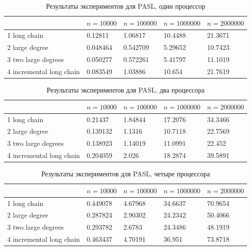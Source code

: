 \documentclass[specification,annotation,times]{itmo-student-thesis}
\begin{document}
\begin{table}[!ht]
\centering
\begin{tabular}{|l|l|l|l|l|}\hline
 & $n=10000$ & $n=100000$ & $n=1000000$ & $n=2000000$ \\\hline
1 long chain & 0.12811 & 1.06817 & 10.4488 & 21.3671 \\\hline
2 large degree & 0.048464 & 0.542709 & 5.29652 & 10.7423 \\\hline
3 two large degrees & 0.050277 & 0.572261 & 5.41797 & 11.1019 \\\hline
4 incremental long chain & 0.083549 & 1.03886 & 10.654 & 21.7619 \\\hline
\end{tabular}
\caption{Результаты экспериментов для PASL, один процессор}\label{tbl:results-pasl-1}
\end{table}

\begin{table}[!ht]
\centering
\begin{tabular}{|l|l|l|l|l|}\hline
 & $n=10000$ & $n=100000$ & $n=1000000$ & $n=2000000$ \\\hline
1 long chain & 0.21437 & 1.84844 & 17.2076 & 34.3466 \\\hline
2 large degree & 0.139132 & 1.1316 & 10.7118 & 22.7569 \\\hline
3 two large degrees & 0.138923 & 1.14019 & 11.0991 & 22.452 \\\hline
4 incremental long chain & 0.204059 & 2.026 & 18.2874 & 39.5891 \\\hline
\end{tabular}
\caption{Результаты экспериментов для PASL, два процессора}\label{tbl:results-pasl-2}
\end{table}

\begin{table}[!ht]
\centering
\begin{tabular}{|l|l|l|l|l|}\hline
 & $n=10000$ & $n=100000$ & $n=1000000$ & $n=2000000$ \\\hline
1 long chain & 0.449078 & 4.67968 & 34.6637 & 70.9654 \\\hline
2 large degree & 0.287824 & 2.90302 & 24.2342 & 50.4066 \\\hline
3 two large degrees & 0.293782 & 2.6783 & 24.3486 & 48.1919 \\\hline
4 incremental long chain & 0.463437 & 4.70191 & 36.951 & 73.8718 \\\hline
\end{tabular}
\caption{Результаты экспериментов для PASL, четыре процессора}\label{tbl:results-pasl-4}
\end{table}
\end{document}
